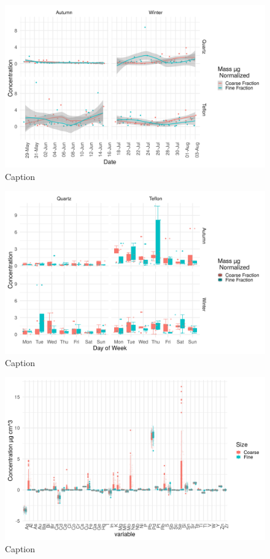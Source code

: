 \documentclass{nwureport}
\begin{document}
\begin{figure}[!htb]
    \centering
    \includegraphics[width=\textwidth]{images/TS_FilterDateSizeSeason_sep_mass.png}
    \caption{Caption}
    \label{fig:summary}
\end{figure}

\begin{figure}[!htb]
    \centering
    \includegraphics[width=\textwidth]{images/TS_FilterDaySizeSeason_mass.png}
    \caption{Caption}
    \label{fig:summary}
\end{figure}


\begin{figure}[!htb]
    \centering
    \includegraphics[width=\textwidth]{images/xrf.png}
    \caption{Caption}
    \label{fig:summary}
\end{figure}
\end{document}
